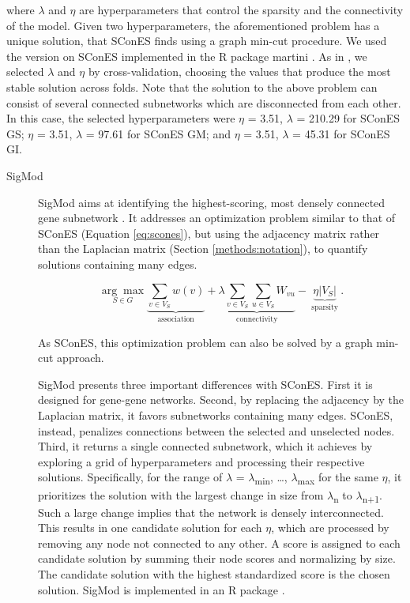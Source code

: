 \documentclass[twocolumn, 11pt, draft]{article}
\begin{document}
\begin{description}
where \(\lambda\) and \(\eta\) are hyperparameters that control the sparsity and the connectivity of the model. Given two hyperparameters, the aforementioned problem has a unique solution, that SConES finds using a graph min-cut procedure. We used the version on SConES implemented in the R package martini \cite{martini}. As in \citet{azencott_efficient_2013}, we selected \(\lambda\) and \(\eta\) by cross-validation, choosing the values that produce the most stable solution across folds. Note that the solution to the above problem can consist of several connected subnetworks which are disconnected from each other. In this case, the selected hyperparameters were \(\eta\) = 3.51, \(\lambda\) = 210.29 for SConES GS; \(\eta\) = 3.51, \(\lambda\) = 97.61 for SConES GM; and \(\eta\) = 3.51, \(\lambda\) = 45.31 for SConES GI.
\end{description}

\begin{description}
\item[{SigMod}] SigMod aims at identifying the highest-scoring, most densely connected gene subnetwork \cite{liu_sigmod:_2017}. It addresses an optimization problem similar to that of SConES (Equation \ref{eq:scones}), but using the adjacency matrix rather than the Laplacian matrix (Section \ref{methods:notation}), to quantify solutions containing many edges.  

\begin{equation*}
\underset{S \in G}{\arg \max } \underbrace{\sum_{v \in V_S} w(v)}_{\text { association }} + \underbrace{\lambda \sum_{v \in V_S} \sum_{u \in V_S} W_{vu} }_{\text { connectivity }} -\underbrace{\eta \lvert V_S \rvert }_{\text { sparsity }}.
\end{equation*}

As SConES, this optimization problem can also be solved by a graph min-cut approach. 

SigMod presents three important differences with SConES. First it is designed for gene-gene networks. Second, by replacing the adjacency by the Laplacian matrix, it favors subnetworks containing many edges. SConES, instead, penalizes connections between the selected and unselected nodes. Third, it returns a single connected subnetwork, which it achieves by exploring a grid of hyperparameters and processing their respective solutions. Specifically, for the range of \(\lambda\) = \(\lambda\)\textsubscript{min}, \dots{}, \(\lambda\)\textsubscript{max} for the same \(\eta\), it prioritizes the solution with the largest change in size from \(\lambda\)\textsubscript{n} to \(\lambda\)\textsubscript{n+1}. Such a large change implies that the network is densely interconnected. This results in one candidate solution for each \(\eta\), which are processed by removing any node not connected to any other. A score is assigned to each candidate solution by summing their node scores and normalizing by size. The candidate solution with the highest standardized score is the chosen solution. SigMod is implemented in an R package \cite{sigmod}.
\end{description}
\end{document}
